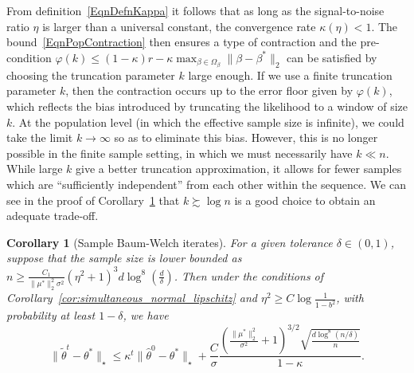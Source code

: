 \documentclass[twoside,11pt]{article}
\newtheorem{cors}{Corollary}
\newcommand{\mycomment}[1]{{\bf{{\blue{{FY --- #1}}}}}}
\newlength{\widebarargwidth}
\newlength{\widebarargheight}
\newlength{\widebarargdepth}
\DeclareRobustCommand{\widebar}[1]{%
  \settowidth{\widebarargwidth}{\ensuremath{#1}}%
  \settoheight{\widebarargheight}{\ensuremath{#1}}%
  \settodepth{\widebarargdepth}{\ensuremath{#1}}%
  \addtolength{\widebarargwidth}{-0.3\widebarargheight}%
  \addtolength{\widebarargwidth}{-0.3\widebarargdepth}%
  \makebox[0pt][l]{\hspace{0.3\widebarargheight}%
    \hspace{0.3\widebarargdepth}%
    \addtolength{\widebarargheight}{0.3ex}%
    \rule[\widebarargheight]{0.95\widebarargwidth}{0.1ex}}%
  {#1}}
\newcommand{\numobs}{\ensuremath{n}}
\newcommand{\usedim}{\ensuremath{d}}
\def\E{ \mathrm{e} }							%
\newcommand{\norm}[1]{\ensuremath{\|#1\|_2}}
\newcommand{\pistat}{\ensuremath{\widebar{\pi}}}
\newcommand{\stat}{\pistat}
\newcommand{\statmin}{\stat_{\min}}
\newcommand{\mixcoefeff}{\ensuremath{\widetilde{\rho}_{\mathrm{mix}}}}
\newcommand{\mixcoefeps}{\ensuremath{\epsilon_{\mathrm{mix}}}}
\newcommand{\paramobs}{\mu}
\newcommand{\trueparamobs}{\ensuremath{\paramobs^*}}
\newcommand{\paramtrans}{\beta}
\newcommand{\trueparamtrans}{\paramtrans^*}
\newcommand{\paramspacetrans}{\ensuremath{\Omega_\paramtrans}}
\newcommand{\paramjoint}{\theta}
\newcommand{\paramjointtil}{\widetilde{\theta}}
\newcommand{\trueparamjoint}{\paramjoint^*}
\newcommand{\addnorm}[1]{\| #1 \|_{\star}}
\newcommand{\SNR}{\eta^2}
\newcommand{\kdim}{\ensuremath{k}}
\newcommand{\BOUNDFUN}{\ensuremath{\varphi}}
\newcommand{\BIGCON}{\ensuremath{C}}
\begin{document}
From definition~\eqref{EqnDefnKappa} it follows that as long as the
signal-to-noise ratio $\eta$ is larger than a universal constant,
the convergence rate $\kappa(\eta) < 1$.  The
bound~\eqref{EqnPopContraction} then ensures a type of contraction and
the pre-condition $\BOUNDFUN(\kdim) \leq (1 - \kappa) r - \kappa
\max_{\paramtrans \in \paramspacetrans} \norm{\paramtrans -
  \trueparamtrans}$ can be satisfied by choosing the truncation
parameter $\kdim$ large enough.  If we use a finite truncation
parameter $\kdim$, then the contraction occurs up to the error floor
given by $\BOUNDFUN(\kdim)$, which reflects the bias introduced by
truncating the likelihood to a window of size $\kdim$.  At the
population level (in which the effective sample size is infinite), we
could take the limit $\kdim \rightarrow \infty$ so as to eliminate
this bias.  However, this is no longer possible in the finite sample
setting, in which we must necessarily have $k \ll \numobs$.
While large $\kdim$ give a better truncation approximation, it 
allows for fewer samples which are ``sufficiently independent''
from each other within the sequence. We can see in the proof of 
Corollary~\ref{cor:normalsim_samplesplit} that $\kdim \succsim \log \numobs$ 
is a good choice to obtain an adequate trade-off. 


\begin{cors}[Sample Baum-Welch iterates]
\label{cor:normalsim_samplesplit}
For a given tolerance $\delta \in (0,1)$, suppose that the sample size
is lower bounded as \mbox{$\numobs \geq
  \frac{\BIGCON_1}{\|\trueparamobs\|_2^2\sigma^2} (\SNR +
  1)^3 \usedim \log^8( \frac{ \usedim}{\delta})$}.
Then under the conditions of
Corollary~\ref{cor:simultaneous_normal_lipschitz} and $\SNR \geq C
 \log\frac{1}{1-b^2}$, with
probability at least $1 - \delta$, we have
\begin{equation}
\label{EqnGaussSampleBound}
\addnorm{\paramjointtil^t - \trueparamjoint} \leq \kappa^t
\addnorm{\widehat{\paramjoint}^0 - \trueparamjoint} +   \frac{\BIGCON}{\sigma}  \frac{
 \left(\frac{\|\trueparamobs\|_2^2}{\sigma^2} +1\right)^{3/2}
\sqrt{ \frac{ \usedim \log^8 (\numobs/\delta)} {\numobs} }
}{1 - \kappa}.
\end{equation}
\end{cors}
%
\noindent 
\end{document}
